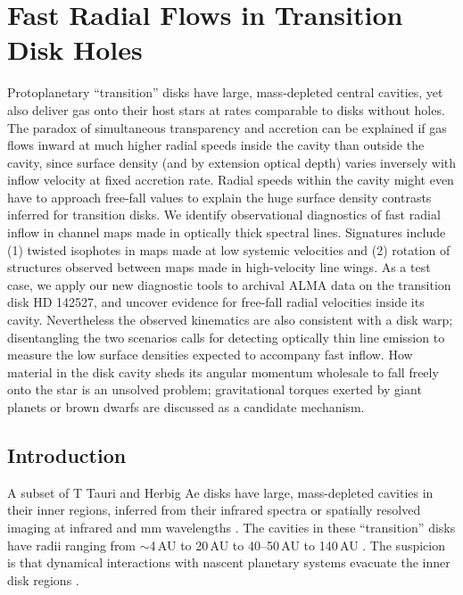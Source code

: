 \chapter{Fast Radial Flows in Transition Disk Holes}\label{chap:radial_flows}


Protoplanetary ``transition'' disks have large, mass-depleted central cavities,
yet also deliver gas onto their host stars at rates comparable to disks
without holes.  The paradox of simultaneous transparency and accretion can
be explained if gas flows inward at much higher radial speeds inside the cavity 
than outside the cavity, since surface density (and by extension optical depth) 
varies inversely with inflow velocity at fixed accretion rate.  Radial speeds 
within the cavity might even have to approach free-fall values to explain the 
huge surface density contrasts inferred for transition disks.  We identify 
observational diagnostics of fast radial inflow in channel maps made in 
optically thick spectral lines.  Signatures include (1) twisted isophotes in 
maps made at low systemic velocities and (2) rotation of structures observed 
between maps made in high-velocity line wings.  As a test case, we apply our 
new diagnostic tools to archival ALMA data on the transition disk HD 142527, 
and uncover evidence for free-fall radial velocities inside its cavity. 
Nevertheless the observed kinematics are also consistent with a disk warp;
disentangling the two scenarios calls for detecting optically thin
line emission to measure the low surface densities expected to
accompany fast inflow.  How material in the disk cavity sheds its
angular momentum wholesale to fall freely onto the star
is an unsolved problem; gravitational torques exerted by giant planets or
brown dwarfs are discussed as a candidate mechanism.

\section{Introduction} \label{intro}

A subset of T Tauri and Herbig Ae disks have large, mass-depleted cavities in 
their inner regions, inferred from their infrared spectra 
\citep[e.g.,][]{Kim13} or spatially resolved imaging at infrared 
\citep[e.g.,][]{geers07} and mm wavelengths \citep[e.g.,][]{brown09}.  The
cavities in these ``transition'' disks have radii ranging from $\sim$4\,AU 
\citep[TW Hya;][]{calvet02,hughes07} to 20\,AU \citep[GM Aur;][]{hughes09} to 
40--50\,AU \citep[LkCa 15;][]{andrews11b,isella12} to 140\,AU \citep[HD 
142527;][]{casassus13}.  The suspicion is that dynamical interactions with 
nascent planetary systems evacuate the inner disk regions 
\citep[e.g.,][]{Zhu11}.


